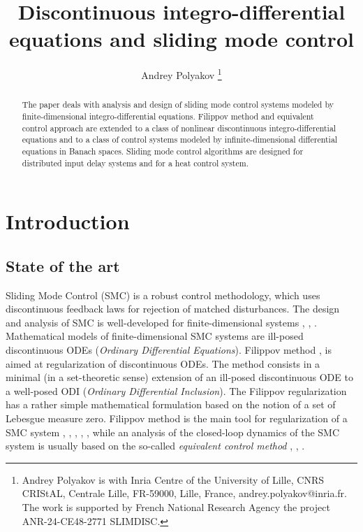 \documentclass{article}
\title{\LARGE \bf 
Discontinuous  integro-differential equations    and sliding mode control
}
\author{Andrey Polyakov \thanks{Andrey Polyakov is with Inria Centre of the University of  Lille, CNRS CRIStAL, Centrale Lille, FR-59000, Lille, France, {andrey.polyakov@inria.fr}. 
		The work is supported by French National Research Agency  the project ANR-24-CE48-2771 SLIMDISC.
}}
\begin{document}
\maketitle

\begin{abstract}
    The paper deals with  analysis and design of sliding mode control  systems modeled by  finite-dimensional integro-differential equations.
    Filippov method and equivalent control approach are extended to a class of 
    nonlinear discontinuous integro-differential equations and to a class of control systems modeled by infinite-dimensional differential equations in Banach spaces. Sliding mode control  algorithms  are  designed for distributed input delay systems  and for a heat control system. 
\end{abstract}
\vspace{-2mm}
\section{Introduction}
\subsection{State of the art} 
Sliding Mode Control (SMC) is a robust control methodology, which uses discontinuous feedback laws for rejection of matched disturbances. The design and analysis  of SMC 
is well-developed for 
finite-dimensional systems \cite{Utkin1992:Book}, \cite{EdwardsSpurgeon1998:Book}, \cite{Shtessel_etal2014:Book}. Mathematical models of finite-dimensional  SMC systems are ill-posed discontinuous  ODEs (\textit{Ordinary Differential Equations}).
 Filippov method \cite{Filippov1988:Book}, \cite{Cortes2008:CSM} is aimed at regularization of discontinuous  ODEs.  The method consists in a minimal (in a set-theoretic sense) extension of an ill-posed discontinuous  ODE to a well-posed ODI (\textit{Ordinary Differential Inclusion}). The Filippov regularization has
 a rather simple mathematical formulation \cite{Filippov1988:Book}  based on the notion of a set of Lebesgue measure zero.
 Filippov method is the main  tool for regularization of  a SMC system \cite{Filippov1988:Book}, \cite{Utkin1992:Book}, \cite{EdwardsSpurgeon1998:Book}, \cite{Shtessel_etal2014:Book}, \cite{PolyakovFridman2014:JFI}, \cite{Utkin_etal2020:Book}
 while an analysis of the closed-loop dynamics of the SMC system is usually based on the so-called \textit{equivalent control method} 
 \cite{Utkin1992:Book}, \cite{EdwardsSpurgeon1998:Book}, \cite{Shtessel_etal2014:Book}.
\end{document}

